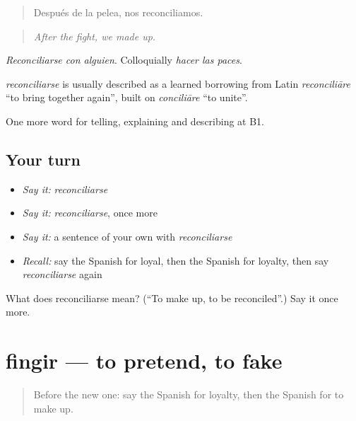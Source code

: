\begin{quote}
Después de la pelea, nos reconciliamos.
\end{quote}

\begin{quote}
\emph{After the fight, we made up.}
\end{quote}

\emph{Reconciliarse con alguien}. Colloquially \emph{hacer las paces}.

\begin{cousinweb}
\emph{reconciliarse} is usually described as a learned borrowing from Latin \emph{reconciliāre} \textquotedblleft{}to bring together again\textquotedblright{}, built on \emph{conciliāre} \textquotedblleft{}to unite\textquotedblright{}.
\end{cousinweb}

\begin{grammarlens}[title={What you've built}]
One more word for telling, explaining and describing at B1.
\end{grammarlens}

\subsection*{Your turn}
\begin{itemize}
\raggedright
  \item \emph{Say it:} \emph{reconciliarse}
  \item \emph{Say it:} \emph{reconciliarse}, once more
  \item \emph{Say it:} a sentence of your own with \emph{reconciliarse}
  \item \emph{Recall:} say the Spanish for loyal, then the Spanish for loyalty, then say \emph{reconciliarse} again
\end{itemize}

\begin{tcolorbox}[breakable,colback=teal!4,colframe=teal!35!black,title={Before you move on}]
What does reconciliarse mean? (\textquotedblleft{}To make up, to be reconciled\textquotedblright{}.) Say it once more.
\end{tcolorbox}
\section[fingir]{fingir — to pretend, to fake}

\label{lesson:ES-C725-fingir}



\begin{quote}
Before the new one: say the Spanish for loyalty, then the Spanish for to make up.
\end{quote}

